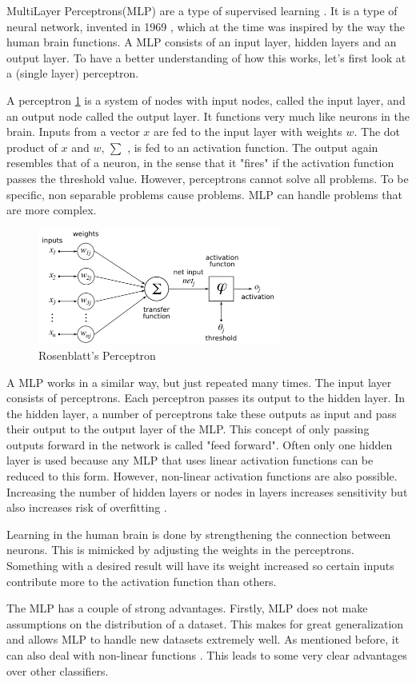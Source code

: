 MultiLayer Perceptrons(MLP) are a type of supervised learning \cite{michie1994machine}. It is a type of neural network, invented in 1969 \cite{minsky1969perceptions}, which at the time  was inspired by the way the human brain functions. A MLP consists of an input layer, hidden layers and an output layer. To have a better understanding of how this works, let's first look at a (single layer) perceptron\cite{rosenblatt1958perceptron}. 

A perceptron \ref{fig:perceptron} is a system of nodes with input nodes, called the input layer, and an output node called the output layer. It functions very much like neurons in the brain. Inputs from a vector $x$ are fed to the input layer with weights $w$. The dot product of $x$ and $w$, $\sum$ ,  is fed to an activation function. The output again resembles that of a neuron, in the sense that it "fires" if the activation function passes the threshold value. However, perceptrons cannot solve all problems. To be specific, non separable problems cause problems. MLP can handle problems that are more complex. \\
\begin{figure}[H]
    \includegraphics[width=80mm]{./img/perceptron.png}
    \caption{Rosenblatt's Perceptron \cite{wikiPerceptronPNG}}
    \label{fig:perceptron}
\end{figure}

A MLP works in a similar way, but just repeated many times. The input layer consists of perceptrons. Each perceptron passes its output to the hidden layer. In the hidden layer, a number of perceptrons take these outputs as input and pass their output to the output layer of the MLP. This concept of only passing outputs forward in the network is called "feed forward". Often only one hidden layer is used because any MLP that uses linear activation functions can be reduced to this form. However, non-linear activation functions are also possible. Increasing the number of hidden layers or nodes in layers increases sensitivity but also increases risk of overfitting \cite{Murtagh1991183}.

Learning in the human brain is done by strengthening the connection between neurons. This is mimicked by adjusting the weights in the perceptrons. Something with a desired result will have its weight increased so certain inputs contribute more to the activation function than others. 

The MLP has a couple of strong advantages. Firstly, MLP does not make assumptions on the distribution of a dataset. This makes for great generalization and allows MLP to handle new datasets extremely well. As mentioned before, it can also deal with non-linear functions \cite{gardner1998artificial}. This leads to some very clear advantages over other classifiers.